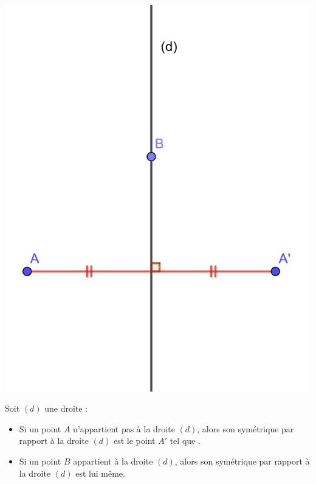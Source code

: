 \documentclass[12pt,a4paper]{article}
\begin{document}
\begin{multicols}{2}
	
	\begin{center}
		\includegraphics*[scale=0.25]{def}
	\end{center}
	
	\begin{myprops}
		Soit $(d)$ une droite :
		\begin{itemize}
			\item Si un point $A$ n'appartient pas à la droite $(d)$, alors son symétrique par rapport à la droite $(d)$ est le point $A'$ tel que .
			\item Si un point $B$ appartient à la droite $(d)$, alors son symétrique par rapport à la droite $(d)$ est lui même.
		\end{itemize}
	\end{myprops}
	
	
\end{multicols}
\end{document}
